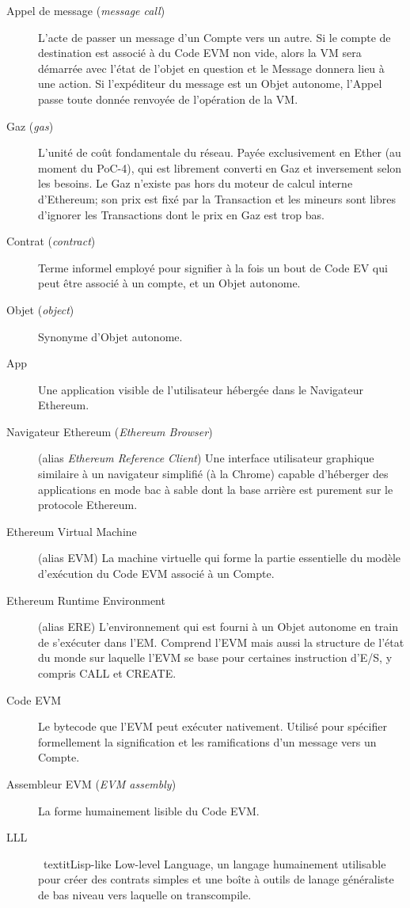 \documentclass[9pt,oneside]{amsart}
\begin{document}
\begin{description}
\item[Appel de message (\textit{message call})\,]
  L'acte de passer un message d'un Compte vers un autre. Si le compte de destination est associé à du Code EVM non vide, alors la VM sera démarrée avec l'état de l'objet en question et le Message donnera lieu à une action. Si l'expéditeur du message est un Objet autonome, l'Appel passe toute donnée renvoyée de l'opération de la VM.

\item[Gaz (\textit{gas})\,]
  L'unité de coût fondamentale du réseau. Payée exclusivement en Ether (au moment du PoC-4), qui est librement converti en Gaz et inversement selon les besoins. Le Gaz n'existe pas hors du moteur de calcul interne d'Ethereum; son prix est fixé par la Transaction et les mineurs sont libres d'ignorer les Transactions dont le prix en Gaz est trop bas.

\item[Contrat (\textit{contract})\,]
  Terme informel employé pour signifier à la fois un bout de Code EV qui peut être associé à un compte, et un Objet autonome.

\item[Objet (\textit{object})\,]
  Synonyme d'Objet autonome.

\item[App\,]
  Une application visible de l'utilisateur hébergée dans le Navigateur Ethereum.

\item[Navigateur Ethereum (\textit{Ethereum Browser})\,]
  (alias \textit{Ethereum Reference Client}) Une interface utilisateur graphique similaire à un navigateur simplifié (à la Chrome) capable d'héberger des applications en mode bac à sable dont la base arrière est purement sur le protocole Ethereum.

\item[Ethereum Virtual Machine\,]
  (alias EVM) La machine virtuelle qui forme la partie essentielle du modèle d'exécution du Code EVM associé à un Compte.

\item[Ethereum Runtime Environment\,]
  (alias ERE) L'environnement qui est fourni à un Objet autonome en train de s'exécuter dans l'EM. Comprend l'EVM mais aussi la structure de l'état du monde sur laquelle l'EVM se base pour certaines instruction d'E/S, y compris CALL et CREATE.

\item[Code EVM\,]
  Le bytecode que l'EVM peut exécuter nativement. Utilisé pour spécifier formellement la signification et les ramifications d'un message vers un Compte.

\item[Assembleur EVM (\textit{EVM assembly})\,]
  La forme humainement lisible du Code EVM.

\item[LLL\,] \
  textit{Lisp-like Low-level Language}, un langage humainement utilisable pour créer des contrats simples et une boîte à outils de lanage généraliste de bas niveau vers laquelle on transcompile.

\end{description}
\end{document}
